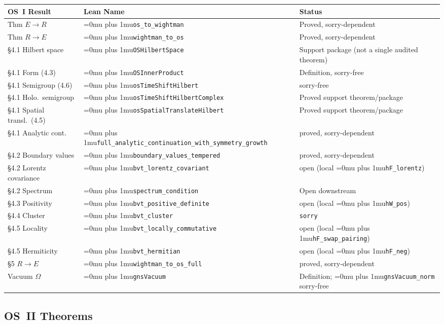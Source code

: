 \documentclass[11pt,a4paper]{article}
\newcommand{\sorry}{\texttt{sorry}}
\newcommand{\leanname}[1]{\begingroup\Urlmuskip=0mu plus 1mu\relax\nolinkurl{#1}\endgroup}
\begin{document}
\begin{center}
{\small
\begin{longtable}{L{4.0cm}L{4.7cm}L{2.8cm}}
\toprule
\textbf{OS~I Result} & \textbf{Lean Name} & \textbf{Status} \\
\midrule
Thm $E \to R$ & \leanname{os\_to\_wightman} & Proved, sorry-dependent \\
Thm $R \to E$ & \leanname{wightman\_to\_os} & Proved, sorry-dependent \\
\S4.1 Hilbert space & \leanname{OSHilbertSpace} & Support package (not a single audited theorem) \\
\S4.1 Form (4.3) & \leanname{OSInnerProduct} & Definition, sorry-free \\
\S4.1 Semigroup (4.6) & \leanname{osTimeShiftHilbert} & sorry-free \\
\S4.1 Holo.\ semigroup & \leanname{osTimeShiftHilbertComplex} & Proved support theorem/package \\
\S4.1 Spatial transl.\ (4.5) & \leanname{osSpatialTranslateHilbert} & Proved support theorem/package \\
\S4.1 Analytic cont.\ & \leanname{full\_analytic\_continuation\_with\_symmetry\_growth} & proved, sorry-dependent \\
\S4.2 Boundary values & \leanname{boundary\_values\_tempered} & proved, sorry-dependent \\
\S4.2 Lorentz covariance & \leanname{bvt\_lorentz\_covariant} & open (local \leanname{hF\_lorentz}) \\
\S4.2 Spectrum & \leanname{spectrum\_condition} & Open downstream \\
\S4.3 Positivity & \leanname{bvt\_positive\_definite} & open (local \leanname{hW\_pos}) \\
\S4.4 Cluster & \leanname{bvt\_cluster} & \sorry \\
\S4.5 Locality & \leanname{bvt\_locally\_commutative} & open (local \leanname{hF\_swap\_pairing}) \\
\S4.5 Hermiticity & \leanname{bvt\_hermitian} & open (local \leanname{hF\_neg}) \\
\S5 $R \to E$ & \leanname{wightman\_to\_os\_full} & proved, sorry-dependent \\
Vacuum $\Omega$ & \leanname{gnsVacuum} & Definition; \leanname{gnsVacuum\_norm} sorry-free \\
\bottomrule
\end{longtable}
}
\end{center}

\subsection{OS~II Theorems}
\end{document}
